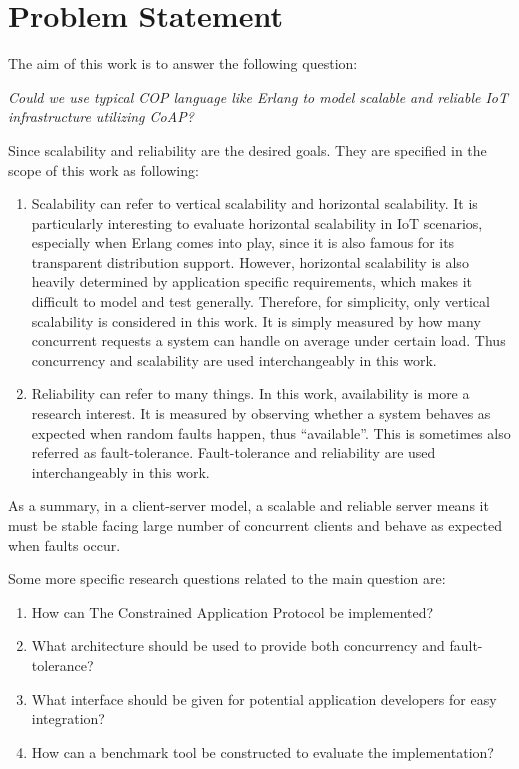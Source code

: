 \chapter{Problem Statement}\label{ch2}


The aim of this work is to answer the following question:

\textit{Could we use typical COP language like Erlang to model scalable and reliable IoT infrastructure utilizing CoAP?}

Since scalability and reliability are the desired goals. They are specified in the scope of this work as following:

\begin{enumerate}

\item Scalability can refer to vertical scalability and horizontal scalability. It is particularly interesting to evaluate horizontal scalability in IoT scenarios, especially when Erlang comes into play, since it is also famous for its transparent distribution support. However, horizontal scalability is also heavily determined by application specific requirements, which makes it difficult to model and test generally. Therefore, for simplicity, only vertical scalability is considered in this work. It is simply measured by how many concurrent requests a system can handle on average under certain load. Thus concurrency and scalability are used interchangeably in this work.

\item Reliability can refer to many things. In this work, availability is more a research interest. It is measured by observing whether a system behaves as expected when random faults happen, thus ``available''. This is sometimes also referred as fault-tolerance. Fault-tolerance and reliability are used interchangeably in this work.

\end{enumerate}

As a summary, in a client-server model, a scalable and reliable server means it must be stable facing large number of concurrent clients and behave as expected when faults occur.

Some more specific research questions related to the main question are:

\begin{enumerate}

\item How can The Constrained Application Protocol be implemented? 
\item What architecture should be used to provide both concurrency and fault-tolerance? 
\item What interface should be given for potential application developers for easy integration? 
\item How can a benchmark tool be constructed to evaluate the implementation? 

\end{enumerate}

